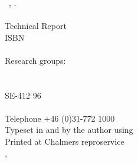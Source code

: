 


\quad \vfill

\noindent
\textbf{\phdtitle}\\
\textsc{\phdauthor}\\
\\
\textcopyright\ \phdauthor, \phdyear.\\
\\
Technical Report \phdtechreportno\\
ISBN \phdisbn\\
\\
Research groups: \phdresearchgroup\\
\phddepartment\\
\phduniversity\\
SE-412 96 \phdcity \\
\phdcountry\\
Telephone +46 (0)31-772 1000\\

\noindent
Typeset in \mainfontfamily{} and \monofontfamily{} by the author using \XeTeX\\
Printed at Chalmers reproservice \\
\phdcity, \phdcountry ~\phdyear
